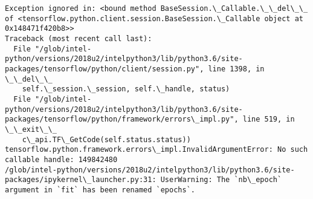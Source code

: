 \documentclass[11pt]{article}
\begin{document}
    \begin{Verbatim}[commandchars=\\\{\}]
Exception ignored in: <bound method BaseSession.\_Callable.\_\_del\_\_ of <tensorflow.python.client.session.BaseSession.\_Callable object at 0x148471f420b8>>
Traceback (most recent call last):
  File "/glob/intel-python/versions/2018u2/intelpython3/lib/python3.6/site-packages/tensorflow/python/client/session.py", line 1398, in \_\_del\_\_
    self.\_session.\_session, self.\_handle, status)
  File "/glob/intel-python/versions/2018u2/intelpython3/lib/python3.6/site-packages/tensorflow/python/framework/errors\_impl.py", line 519, in \_\_exit\_\_
    c\_api.TF\_GetCode(self.status.status))
tensorflow.python.framework.errors\_impl.InvalidArgumentError: No such callable handle: 149842480
/glob/intel-python/versions/2018u2/intelpython3/lib/python3.6/site-packages/ipykernel\_launcher.py:31: UserWarning: The `nb\_epoch` argument in `fit` has been renamed `epochs`.

    \end{Verbatim}
\end{document}

